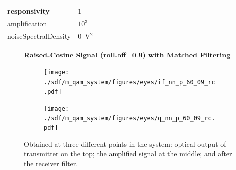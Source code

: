 \begin{refsection}
\begin{table}[H]
\begin{tabular}{|l|l|}
				responsivity           & $1$                                                        \\ \hline
				amplification          & $10^3$                                                     \\ \hline
				noiseSpectralDensity   & $0$~V$^2$                             					\\ \hline
	\end{tabular}
\end{table}
\begin{figure}[H]
	\centering
	\textbf{Raised-Cosine Signal (roll-off=0.9) with Matched Filtering}
	\begin{minipage}{\linewidth}
		\centering
	\begin{subfigure}{.45\textwidth}
		\centering
		\texttt{[image: ./sdf/m\_qam\_system/figures/eyes/if\_nn\_p\_60\_09\_rc.pdf]}
	\end{subfigure}
	\begin{subfigure}{.45\textwidth}
		\centering
		\texttt{[image: ./sdf/m\_qam\_system/figures/eyes/q\_nn\_p\_60\_09\_rc.pdf]}
	\end{subfigure}
	
	\caption{
		Obtained at
		three different points in the system: optical output of transmitter on the top;
		the amplified signal at the middle; and
		after the receiver filter.
		\label{fig:eyes_nn_rc_09}}
	\end{minipage}
\end{figure}


\end{refsection}
